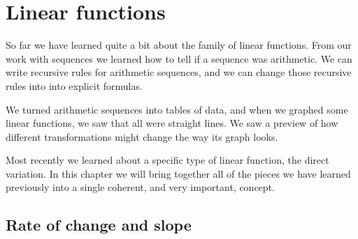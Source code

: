 \chapter{Linear functions}
\label{ch:linear}


So far we have learned quite a bit about the family of linear functions. From our work with sequences we learned how to tell if a sequence was arithmetic. We can write recursive rules for arithmetic sequences, and we can change those recursive rules into into explicit formulas.

We turned arithmetic sequences into tables of data, and when we graphed some linear functions, we saw that all were straight lines. We saw a preview of how different transformations might change the way its graph looks.

Most recently we learned about a specific type of linear function, the direct variation. In this chapter we will bring together all of the pieces we have learned previously into a single coherent, and very important, concept.

\section{Rate of change and slope}
\label{sec:rateofchange}


